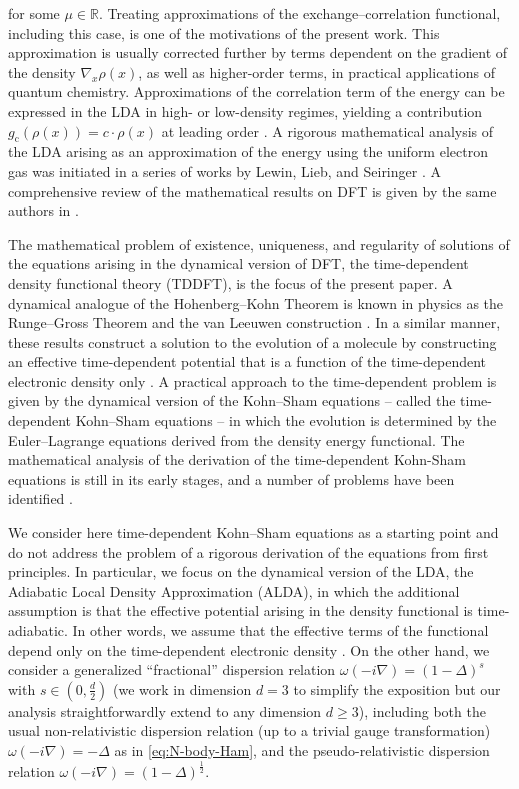 \documentclass[12pt,a4paper]{amsart}
\numberwithin{equation}{section}
\begin{document}
	for some $\mu \in \mathbb{R}$. Treating approximations of the exchange–correlation functional, including this case, is one of the motivations of the present work. This approximation is usually corrected further by terms dependent on the gradient of the density $ \nabla_x \rho(x) $, as well as higher-order terms, in practical applications of quantum chemistry. Approximations of the correlation term of the energy can be expressed in the LDA in high- or low-density regimes, yielding a contribution~$ g_{\mathrm{c}}(\rho(x)) = c \cdot \rho(x) $ at leading order \cite[Section 4.3]{engel2011density}. A rigorous mathematical analysis of the LDA arising as an approximation of the energy using the uniform electron gas was initiated in a series of works by Lewin, Lieb, and Seiringer \cite{lewin2018statistical,lewin2019local}. A comprehensive review of the mathematical results on DFT is given by the same authors in \cite{lewin2022universal}.
	
	The mathematical problem of existence, uniqueness, and regularity of solutions of the equations arising in the dynamical version of DFT, the time-dependent density functional theory (TDDFT), is the focus of the present paper. A dynamical analogue of the Hohenberg–Kohn Theorem is known in physics as the Runge–Gross Theorem and the van Leeuwen construction \cite{RungeGross1984,Leeuwen1999}. In a similar manner, these results construct a solution to the evolution of a molecule by constructing an effective time-dependent potential that is a function of the time-dependent electronic density only \cite[Section 7.1]{engel2011density}. A practical approach to the time-dependent problem is given by the dynamical version of the Kohn–Sham equations -- called the time-dependent Kohn–Sham equations -- in which the evolution is determined by the Euler–Lagrange equations derived from the density energy functional. The mathematical analysis of the derivation of the time-dependent Kohn-Sham equations is still in its early stages, and a number of problems have been identified \cite{Schrimer2025,FournaisetAl2016}.
	
	We consider here time-dependent Kohn–Sham equations as a starting point and do not address the problem of a rigorous derivation of the equations from first principles. In particular, we focus on the dynamical version of the LDA, the Adiabatic Local Density Approximation (ALDA), in which the additional assumption is that the effective potential arising in the density functional is time-adiabatic. In other words, we assume that the effective terms of the functional depend only on the time-dependent electronic density \cite[Section 7.3]{engel2011density}. On the other hand, we consider a generalized ``fractional'' dispersion relation $\omega(-i\nabla)=(1-\Delta)^s$ with $s\in(0,\frac{d}{2})$ (we work in dimension $d=3$ to simplify the exposition but our analysis straightforwardly extend to any dimension $d\ge3$), including both the usual non-relativistic dispersion relation (up to a trivial gauge transformation) $\omega(-i\nabla)=-\Delta$ as in \eqref{eq:N-body-Ham}, and the pseudo-relativistic dispersion relation $\omega(-i\nabla)=(1-\Delta)^{\frac12}$.
	
\end{document}
